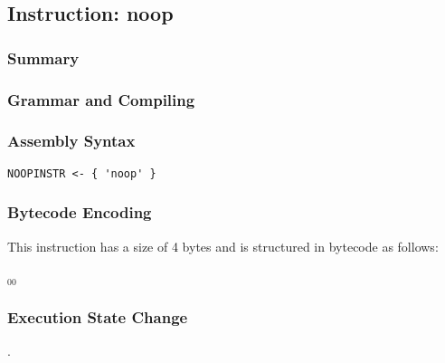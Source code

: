 \subsection{Instruction: noop}

\subsubsection{Summary}


\subsubsection{Grammar and Compiling}


\subsubsection{Assembly Syntax}

\begin{myquote}
\begin{verbatim}
NOOPINSTR <- { 'noop' }
\end{verbatim}
\end{myquote}

\subsubsection{Bytecode Encoding}

This instruction has a size of 4 bytes and is structured in bytecode as follows:

$_{00}$\ 


\subsubsection{Execution State Change}

.


